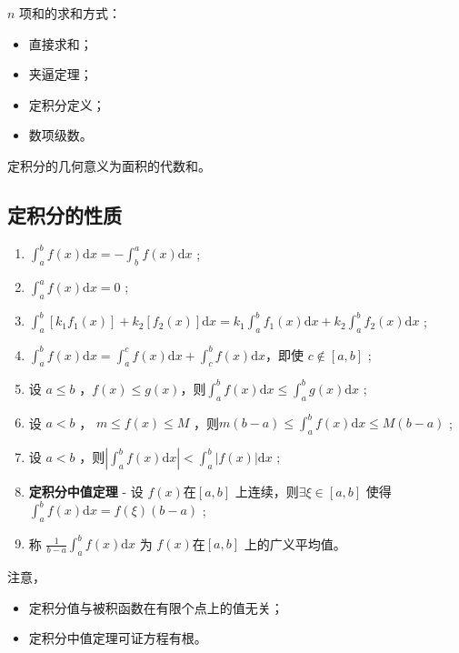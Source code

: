 $ n $ 项和的求和方式：
\begin{itemize}
    \item 直接求和；
    \item 夹逼定理；
    \item 定积分定义；
    \item 数项级数。
\end{itemize}

\begin{Field}[定积分的几何意义]

    定积分的几何意义为面积的代数和。
\end{Field}

\subsection{定积分的性质}

\begin{enumerate}
    \item $ \int_a^b f(x)\mathrm{d}x = -\int_b^a f(x)\mathrm{d}x $ ;
    \item $ \int_a^a f(x)\mathrm{d}x = 0 $ ;
    \item $ \int_a^b [k_1 f_1(x)]+k_2[f_2(x)]\mathrm{d}x = k_1\int_a^b f_1(x)\mathrm{d}x + k_2\int_a^b f_2(x)\mathrm{d}x $ ;
    \item $ \int_a^b f(x)\mathrm{d}x = \int_a^c f(x)\mathrm{d}x + \int_c^b f(x)\mathrm{d}x $，即使 $ c\not\in [a,b] $ ;
    \item 设 $ a\leq b $ ，$ f(x)\leq g(x) $，则$ \int_a^b f(x)\mathrm{d}x \leq \int_a^b g(x)\mathrm{d}x $ ;
    \item 设 $ a < b $ ， $ m\leq f(x)\leq M $ ，则$ m(b-a)\leq\int_a^b f(x)\mathrm{d}x \leq M(b-a)$ ;
    \item 设 $ a<b $ ，则$ |\int_a^b f(x) \mathrm{d}x | < \int_a^b|f(x)|\mathrm{d}x $ ;
    \item \textbf{定积分中值定理} - 设 $ f(x) $在$ [a,b] $ 上连续，则$\exists \xi \in [a,b]  $ 
    使得 $ \int_a^b f(x)\mathrm{d}x = f(\xi)(b-a) $ ;
    \item 称 $ \frac{1}{b-a}\int_a^b f(x)\mathrm{d}x $ 为 $ f(x) $在$ [a,b] $ 上的广义平均值。
\end{enumerate}

注意，\begin{itemize}
    \item 定积分值与被积函数在有限个点上的值无关；
    \item 定积分中值定理可证方程有根。
\end{itemize}

